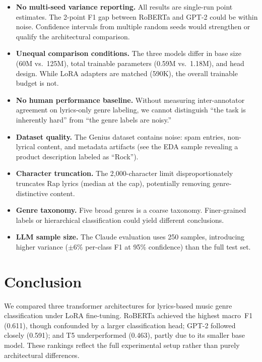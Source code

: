 \documentclass[11pt,a4paper]{article}
\begin{document}
\begin{itemize}[leftmargin=*,itemsep=2pt]
\item \textbf{No multi-seed variance reporting.}
  All results are single-run point estimates.
  The 2-point F1 gap between RoBERTa and GPT-2 could be within noise.
  Confidence intervals from multiple random seeds would strengthen or
  qualify the architectural comparison.

\item \textbf{Unequal comparison conditions.}
  The three models differ in base size (60M vs.\ 125M), total trainable
  parameters (0.59M vs.\ 1.18M), and head design.
  While LoRA adapters are matched (590K), the overall trainable budget
  is not.

\item \textbf{No human performance baseline.}
  Without measuring inter-annotator agreement on lyrics-only genre
  labeling, we cannot distinguish ``the task is inherently hard'' from
  ``the genre labels are noisy.''

\item \textbf{Dataset quality.}
  The Genius dataset contains noise: spam entries, non-lyrical content,
  and metadata artifacts (see the EDA sample revealing a product
  description labeled as ``Rock'').

\item \textbf{Character truncation.}
  The 2{,}000-character limit disproportionately truncates Rap lyrics
  (median at the cap), potentially removing genre-distinctive content.

\item \textbf{Genre taxonomy.}
  Five broad genres is a coarse taxonomy.
  Finer-grained labels or hierarchical classification could yield
  different conclusions.

\item \textbf{LLM sample size.}
  The Claude evaluation uses 250 samples, introducing higher variance
  ($\pm$6\% per-class F1 at 95\% confidence) than the full test set.
\end{itemize}


\section{Conclusion}
\label{sec:conclusion}

We compared three transformer architectures for lyrics-based music
genre classification under LoRA fine-tuning.
RoBERTa achieved the highest macro~F1 (0.611), though confounded
by a larger classification head; GPT-2 followed closely (0.591);
and T5 underperformed (0.463), partly due to its smaller base model.
These rankings reflect the full experimental setup rather than purely
architectural differences.
\end{document}
